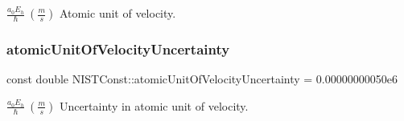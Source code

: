 $\frac{a_0 E_h}{\hbar} \ (\frac{m}{s})$ Atomic unit of velocity. \mbox{\label{group___atomic_unit_ga519034dfac791b4fd441640dd6859c2e}} 
\subsubsection{\texorpdfstring{atomic\+Unit\+Of\+Velocity\+Uncertainty}{atomicUnitOfVelocityUncertainty}}
{\footnotesize\ttfamily const double N\+I\+S\+T\+Const\+::atomic\+Unit\+Of\+Velocity\+Uncertainty = 0.\+00000000050e6}

$\frac{a_0 E_h}{\hbar} \ (\frac{m}{s})$ Uncertainty in atomic unit of velocity. 